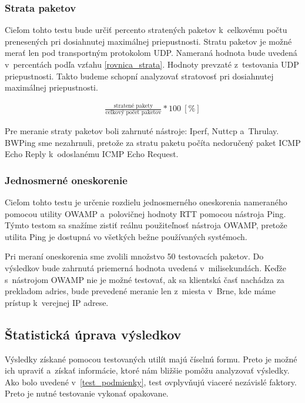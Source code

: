         \subsubsection{Strata paketov}
        Cieľom tohto testu bude určiť percento stratených paketov k~celkovému
        počtu prenesených pri dosiahnutej maximálnej priepustnosti.
        Stratu paketov je možné merať len pod transportným protokolom UDP. 
        Nameraná
        hodnota bude uvedená v~percentách podľa vzťahu \ref{rovnica_strata}.
        Hodnoty prevzaté z~testovania UDP
        priepustnosti. Takto budeme schopní analyzovať stratovosť pri dosiahnutej
        maximálnej priepustnosti.

        \begin{eqnarray} \label{rovnica_strata}
            \frac{\text{stratené pakety}}{\text{celkový počet paketov}} * 100\ [\%]
        \end{eqnarray}
        
        Pre meranie straty paketov boli zahrnuté nástroje: Iperf, Nuttcp
a~Thrulay. BWPing sme nezahrnuli, pretože za stratu paketu počíta
        nedoručený paket ICMP Echo Reply k~odoslanému ICMP Echo Request.

        \subsubsection{Jednosmerné oneskorenie} \label{metod_jednos_ones}
        Cieľom tohto testu je určenie rozdielu jednosmerného oneskorenia 
        nameraného pomocou utility OWAMP a~polovičnej hodnoty RTT pomocou
        nástroja Ping. Týmto
        testom sa snažíme zistiť reálnu použiteľnosť nástroja OWAMP, pretože
        utilita Ping je dostupná vo všetkých bežne používaných systémoch.
        
        Pri meraní oneskorenia sme zvolili množstvo 50 testovacích paketov.
        Do výsledkov bude zahrnutá priemerná hodnota uvedená v~milisekundách.
        Keďže s~nástrojom OWAMP nie je možné testovať, ak sa klientská
        časť nachádza za prekladom adries, bude prevedené meranie 
        len z~miesta v~Brne, kde máme prístup k~verejnej IP adrese.

        \subsection{Štatistická úprava výsledkov} \label{test_stat}
        Výsledky získané pomocou testovaných utilít majú číselnú formu. Preto je
        možné ich upraviť a~získať informácie, ktoré nám bližšie pomôžu analyzovať 
        výsledky. Ako bolo uvedené v~\ref{test_podmienky}, test ovplyvňujú viaceré
        nezávislé faktory. Preto je nutné testovanie vykonať opakovane.

